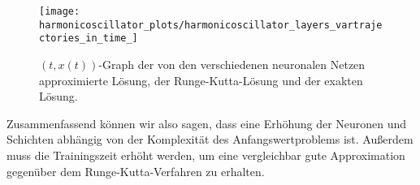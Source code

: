 \begin{figure}
       \centering
       \texttt{[image: harmonicoscillator\_plots/harmonicoscillator\_layers\_vartrajectories\_in\_time\_]}
       \caption{$(t,x(t))$-Graph der von den verschiedenen neuronalen Netzen approximierte Lösung, der
       Runge-Kutta-Lösung und der exakten Lösung.}
       \label{fig:harmonic-layers-variable-trajectories-in-time}
\end{figure}
Zusammenfassend können wir also sagen, dass eine Erhöhung der Neuronen und Schichten abhängig von der Komplexität des
Anfangswertproblems ist. Außerdem muss die Trainingszeit erhöht werden, um eine vergleichbar gute Approximation
gegenüber dem Runge-Kutta-Verfahren zu erhalten.
\clearpage
